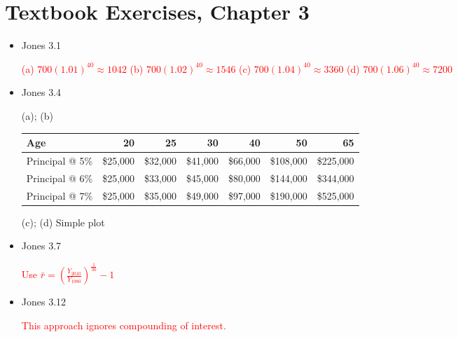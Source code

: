 \documentclass{article}
\begin{document}
\section{Textbook Exercises, Chapter 3}

\begin{itemize}

\item Jones 3.1

\textcolor{red}{(a) $700(1.01)^{40}\approx1042$ (b) $700(1.02)^{40}\approx1546$ (c) $700(1.04)^{40}\approx3360$ (d) $700(1.06)^{40}\approx7200$}

\item Jones 3.4

(a); (b)

\begin{table}[htbp]
\centering
\begin{tabular}{lrrrrrr}
\hline
Age & 20 & 25 & 30 & 40 & 50 & 65 \\
\hline
Principal @ 5\% & \$25,000 & \$32,000 & \$41,000 & \$66,000 & \$108,000 & \$225,000 \\
Principal @ 6\% & \$25,000 & \$33,000 & \$45,000 & \$80,000 & \$144,000 & \$344,000 \\
Principal @ 7\% & \$25,000 & \$35,000 & \$49,000 & \$97,000 & \$190,000 & \$525,000 \\
\hline
\end{tabular}
\end{table}

(c); (d)
Simple plot

\item Jones 3.7

\textcolor{red}{Use $\bar{r} = \left(\frac{Y_{2010}}{Y_{1980}}\right)^{\frac1{30}} - 1$}

\item Jones 3.12

\textcolor{red}{This approach ignores compounding of interest.}

\end{itemize}
\end{document}

